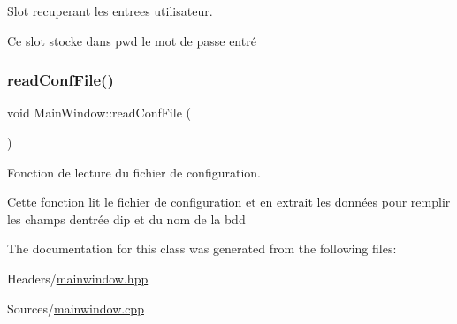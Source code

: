 Slot recuperant les entrees utilisateur. 

Ce slot stocke dans pwd le mot de passe entré \mbox{\label{classMainWindow_ad098a8e0f66eebcdda2a7a1ee7fba382}} 
\subsubsection{\texorpdfstring{read\+Conf\+File()}{readConfFile()}}
{\footnotesize\ttfamily void Main\+Window\+::read\+Conf\+File (\begin{DoxyParamCaption}{ }\end{DoxyParamCaption})}



Fonction de lecture du fichier de configuration. 

Cette fonction lit le fichier de configuration et en extrait les données pour remplir les champs d\textquotesingle{}entrée d\textquotesingle{}ip et du nom de la bdd 

The documentation for this class was generated from the following files\+:\begin{DoxyCompactItemize}
\item 
Headers/\mbox{\hyperlink{mainwindow_8hpp}{mainwindow.\+hpp}}\item 
Sources/\mbox{\hyperlink{mainwindow_8cpp}{mainwindow.\+cpp}}\end{DoxyCompactItemize}
